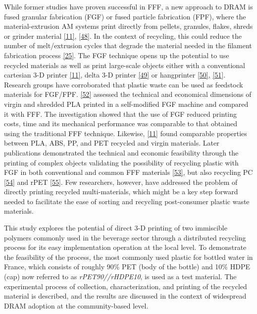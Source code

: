 \documentclass[
]{article}
\begin{document}
While former studies have proven successful in FFF, a new approach to
DRAM is fused granular fabrication (FGF) or fused particle fabrication
(FPF), where the material-extrusion AM systems print directly from
pellets, granules, flakes, shreds or grinder material
\protect\hyperlink{ref-woern2018}{{[}11{]}},
\protect\hyperlink{ref-fontana2022}{{[}48{]}}. In the context of
recycling, this could reduce the number of melt/extrusion cycles that
degrade the material needed in the filament fabrication process
\protect\hyperlink{ref-cruzsanchez2017}{{[}25{]}}. The FGF technique
opens up the potential to use recycled materials as well as print
large-scale objects either with a conventional cartesian 3-D printer
\protect\hyperlink{ref-woern2018}{{[}11{]}}, delta 3-D printer
\protect\hyperlink{ref-grassi2019}{{[}49{]}} or hangprinter
\protect\hyperlink{ref-petsiuk2022}{{[}50{]}},
\protect\hyperlink{ref-rattan2023}{{[}51{]}}. Research groups have
corroborated that plastic waste can be used as feedstock materials for
FGF/FPF. \protect\hyperlink{ref-alexandre2020}{{[}52{]}} assessed the
technical and economical dimensions of virgin and shredded PLA printed
in a self-modified FGF machine and compared it with FFF. The
investigation showed that the use of FGF reduced printing costs, time
and its mechanical performance was comparable to that obtained using the
traditional FFF technique. Likewise,
\protect\hyperlink{ref-woern2018}{{[}11{]}} found comparable properties
between PLA, ABS, PP, and PET recycled and virgin materials. Later
publications demonstrated the technical and economic feasibility through
the printing of complex objects validating the possibility of recycling
plastic with FGF in both conventional and common FFF materials
\protect\hyperlink{ref-byard2019}{{[}53{]}}, but also recycling PC
\protect\hyperlink{ref-reich2019b}{{[}54{]}} and rPET
\protect\hyperlink{ref-little2020}{{[}55{]}}. Few researchers, however,
have addressed the problem of directly printing recycled
multi-materials, which might be a key step forward needed to facilitate
the ease of sorting and recycling post-consumer plastic waste materials.

This study explores the potential of direct 3-D printing of two
immiscible polymers commonly used in the beverage sector through a
distributed recycling process for its easy implementation operation at
the local level. To demonstrate the feasibility of the process, the most
commonly used plastic for bottled water in France, which consists of
roughly 90\% PET (body of the bottle) and 10\% HDPE (cap) now referred
to as \emph{rPET90//rHDPE10}, is used as a test material. The
experimental process of collection, characterization, and printing of
the recycled material is described, and the results are discussed in the
context of widespread DRAM adoption at the community-based level.
\end{document}
